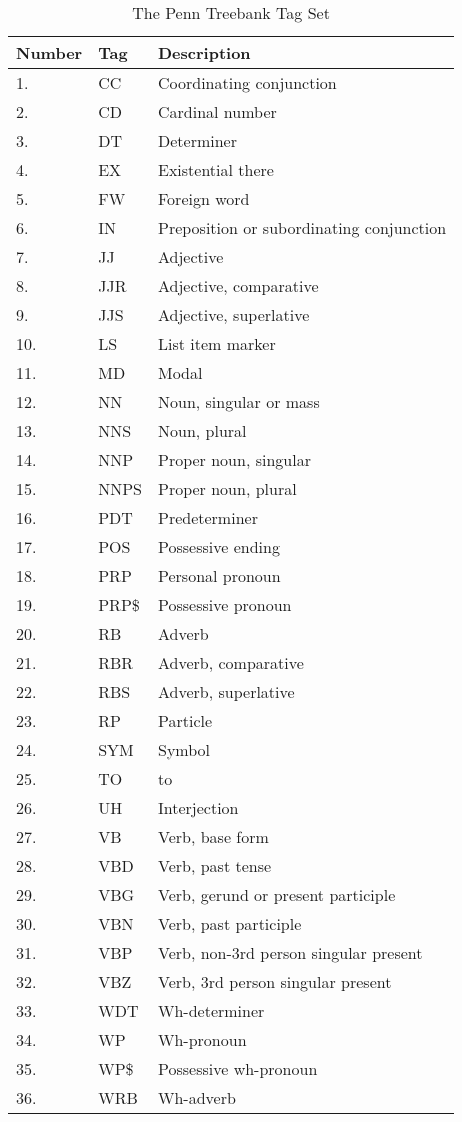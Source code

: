 \begin{table}
\centering
\caption{The Penn Treebank Tag Set \cite{PennTreeBankTagSet}}
\begin{tabular}{|l|l|l|} \hline
\textbf{Number}	&\textbf{Tag}	&\textbf{Description}\\ \hline
1. 	&CC 	&Coordinating conjunction\\
2. 	&CD 	&Cardinal number\\
3. 	&DT 	&Determiner\\
4. 	&EX 	&Existential there\\
5. 	&FW 	&Foreign word\\
6. 	&IN 	&Preposition or subordinating conjunction\\
7. 	&JJ 	&Adjective\\
8. 	&JJR 	&Adjective, comparative\\
9. 	&JJS 	&Adjective, superlative\\
10. 	&LS 	&List item marker\\
11. 	&MD 	&Modal\\
12. 	&NN 	&Noun, singular or mass\\
13. 	&NNS 	&Noun, plural\\
14. 	&NNP 	&Proper noun, singular\\
15. 	&NNPS 	&Proper noun, plural\\
16. 	&PDT 	&Predeterminer\\
17. 	&POS 	&Possessive ending\\
18. 	&PRP 	&Personal pronoun\\
19. 	&PRP\$ 	&Possessive pronoun\\
20. 	&RB 	&Adverb\\
21. 	&RBR 	&Adverb, comparative\\
22. 	&RBS 	&Adverb, superlative\\
23. 	&RP 	&Particle\\
24. 	&SYM 	&Symbol\\
25. 	&TO 	&to\\
26. 	&UH 	&Interjection\\
27. 	&VB 	&Verb, base form\\
28. 	&VBD 	&Verb, past tense\\
29. 	&VBG 	&Verb, gerund or present participle\\
30. 	&VBN 	&Verb, past participle\\
31. 	&VBP 	&Verb, non-3rd person singular present\\
32. 	&VBZ 	&Verb, 3rd person singular present\\
33. 	&WDT 	&Wh-determiner\\
34. 	&WP 	&Wh-pronoun\\
35. 	&WP\$ 	&Possessive wh-pronoun\\
36. 	&WRB 	&Wh-adverb \\
\hline
\end{tabular}

\label{tab:tagSet}
\end{table}


